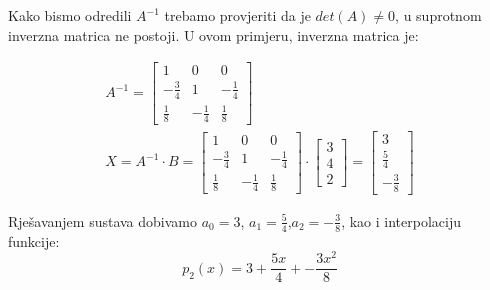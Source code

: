 \begin{multicols}{2}

Kako bismo odredili $A^{-1}$ trebamo provjeriti da je $det(A)\neq0$, u suprotnom inverzna matrica ne postoji. U ovom primjeru, inverzna matrica je:

\begin{gather*}
A^{-1} =
\begin{bmatrix}
1 & 0 & 0\\
-{\frac{3}{4}} & 1 & -{\frac{1}{4}}\\
{\frac{1}{8}} & -{\frac{1}{4}} & {\frac{1}{8}}
\end{bmatrix}\\
X = A^{-1}\cdot B =
\begin{bmatrix}
1 & 0 & 0\\
-\frac{3}{4} & 1 & -\frac{1}{4}\\
\frac{1}{8} & -\frac{1}{4} & \frac{1}{8}
\end{bmatrix}
\cdot
\begin{bmatrix}
3 \\ 4 \\ 2
\end{bmatrix}
=
\begin{bmatrix}
3 \\ \frac{5}{4} \\ -\frac{3}{8}
\end{bmatrix}
\end{gather*}

Rješavanjem sustava dobivamo $a_0=3$, $a_1=\frac{5}{4}$,\break$a_2=-\frac{3}{8}$,
kao i interpolaciju funkcije:
$$
p_2(x) = 3 + \frac{5x}{4} + -\frac{3x^2}{8}
$$

\newcolumn

\vspace*{0pt}


\end{multicols}
